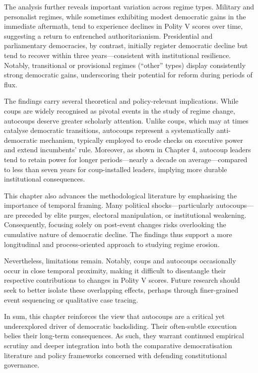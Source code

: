 \documentclass[
  12pt,
]{report}
\begin{document}
The analysis further reveals important variation across regime types.
Military and personalist regimes, while sometimes exhibiting modest
democratic gains in the immediate aftermath, tend to experience declines
in Polity V scores over time, suggesting a return to entrenched
authoritarianism. Presidential and parliamentary democracies, by
contrast, initially register democratic decline but tend to recover
within three years---consistent with institutional resilience. Notably,
transitional or provisional regimes (``other'' types) display
consistently strong democratic gains, underscoring their potential for
reform during periods of flux.

The findings carry several theoretical and policy-relevant implications.
While coups are widely recognised as pivotal events in the study of
regime change, autocoups deserve greater scholarly attention. Unlike
coups, which may at times catalyse democratic transitions, autocoups
represent a systematically anti-democratic mechanism, typically employed
to erode checks on executive power and extend incumbents' rule.
Moreover, as shown in Chapter 4, autocoup leaders tend to retain power
for longer periods---nearly a decade on average---compared to less than
seven years for coup-installed leaders, implying more durable
institutional consequences.

This chapter also advances the methodological literature by emphasising
the importance of temporal framing. Many political shocks---particularly
autocoups---are preceded by elite purges, electoral manipulation, or
institutional weakening. Consequently, focusing solely on post-event
changes risks overlooking the cumulative nature of democratic decline.
The findings thus support a more longitudinal and process-oriented
approach to studying regime erosion.

Nevertheless, limitations remain. Notably, coups and autocoups
occasionally occur in close temporal proximity, making it difficult to
disentangle their respective contributions to changes in Polity V
scores. Future research should seek to better isolate these overlapping
effects, perhaps through finer-grained event sequencing or qualitative
case tracing.

In sum, this chapter reinforces the view that autocoups are a critical
yet underexplored driver of democratic backsliding. Their often-subtle
execution belies their long-term consequences. As such, they warrant
continued empirical scrutiny and deeper integration into both the
comparative democratisation literature and policy frameworks concerned
with defending constitutional governance.
\end{document}
